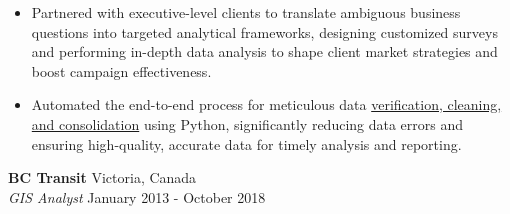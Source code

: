 \documentclass[letterpaper]{article}
\newcommand{\employer}[4]{
        \vspace{3pt}
        \textbf{#1}  %
        \hfill #2\\  %
        \textit{#3}  %
        \hfill #4\\  %
        \vspace{3mm}
    }
\newenvironment{jobtasklist}
        {
            \vspace{-12pt}
            \begin{itemize} \itemsep 0pt
        }{
            \end{itemize}
            \vspace{-3pt}
        }
\newcommand{\impt}[1]{\uline{#1}}
\begin{document}
\begin{jobtasklist}
        \item Partnered with executive-level clients to translate ambiguous business questions
                into targeted analytical frameworks, designing customized surveys and
                performing in-depth data analysis to shape client market strategies and boost campaign effectiveness.
        \item Automated the end-to-end process for meticulous data
                \impt{verification, cleaning, and consolidation} using Python,
                significantly reducing data errors and ensuring high-quality, accurate data for timely analysis and reporting.
\end{jobtasklist}


\employer
    {BC Transit}
    {Victoria, Canada}
    {GIS Analyst}
    {January 2013 - October 2018}
\end{document}
